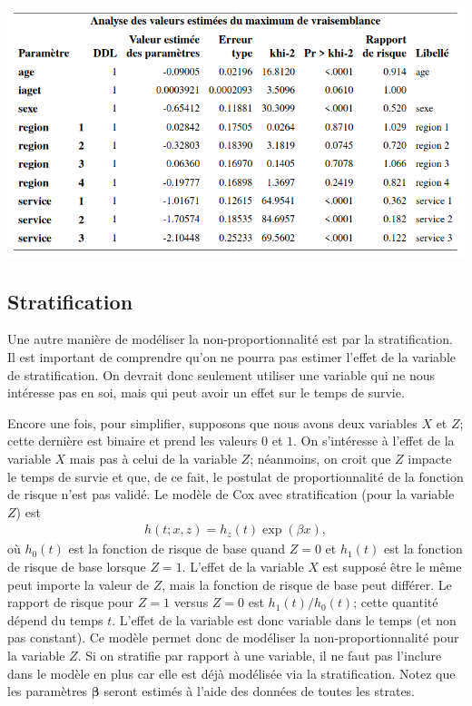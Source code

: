 \documentclass[
  11pt,
  letterpaper,
]{book}
\theoremstyle{definition}
\theoremstyle{definition}
\theoremstyle{definition}
\theoremstyle{remark}
\begin{document}
\begin{center}\includegraphics[width=0.85\linewidth]{figures/05-survie-e30} \end{center}

\hypertarget{stratification}{%
\subsection{Stratification}\label{stratification}}

Une autre manière de modéliser la non-proportionnalité est par la stratification. Il est important de comprendre qu'on ne pourra pas estimer l'effet de la variable de stratification. On devrait donc seulement utiliser une variable qui ne nous intéresse pas en soi, mais qui peut avoir un effet sur le temps de survie.

Encore une fois, pour simplifier, supposons que nous avons deux variables \(X\) et \(Z\); cette dernière est binaire et prend les valeurs \(0\) et \(1\). On s'intéresse à l'effet de la variable \(X\) mais pas à celui de la variable \(Z\); néanmoins, on croit que \(Z\) impacte le temps de survie et que, de ce fait, le postulat de proportionnalité de la fonction de risque n'est pas validé. Le modèle de Cox avec stratification (pour la variable \(Z\)) est
\begin{align*}
h(t; x, z) = h_z(t) \exp(\beta x),
\end{align*}
où \(h_0(t)\) est la fonction de risque de base quand \(Z=0\) et \(h_1(t)\) est la fonction de risque de base lorsque \(Z=1\). L'effet de la variable \(X\) est supposé être le même peut importe la valeur de \(Z\), mais la fonction de risque de base peut différer. Le rapport de risque pour \(Z=1\) versus \(Z=0\) est \(h_1(t)/h_0(t)\); cette quantité dépend du temps \(t\). L'effet de la variable est donc variable dans le temps (et non pas constant). Ce modèle permet donc de modéliser la non-proportionnalité pour la variable \(Z\). Si on stratifie par rapport à une variable, il ne faut pas l'inclure dans le modèle en plus car elle est déjà modélisée via la stratification. Notez que les paramètres \(\boldsymbol{\beta}\) seront estimés à l'aide des données de toutes les strates.
\end{document}
